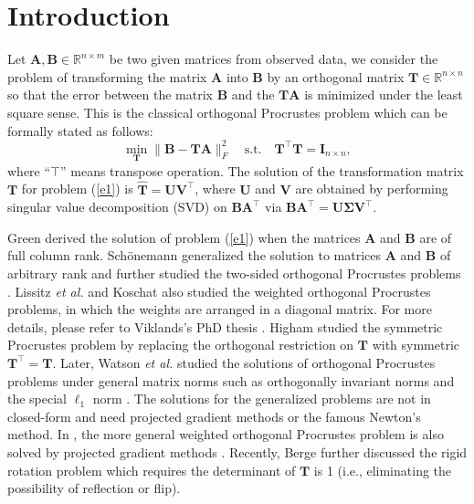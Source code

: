\documentclass[titlepage,11pt,twoside]{article}
\begin{document}
\section{Introduction}
Let $\mathbf{A},\mathbf{B}\in\mathbb{R}^{n\times m}$ be two given matrices from observed data, we consider the problem of transforming the matrix $\mathbf{A}$ into $\mathbf{B}$ by an orthogonal matrix $\mathbf{T}\in\mathbb{R}^{n\times n}$ so that the error between the matrix $\mathbf{B}$ and the $\mathbf{T}\mathbf{A}$ is minimized under the least square sense. This is the classical orthogonal Procrustes problem \cite{procrustesprogram} which can be formally stated as follows:
\begin{equation}\label{e1}
\min_{\mathbf{T}}\|\mathbf{B}-\mathbf{T}\mathbf{A}\|_{F}^{2}
\quad
\text{s.t.}
\quad
\mathbf{T}^{\top}\mathbf{T} = \mathbf{I}_{n\times n},
\end{equation}
where ``$\top$'' means transpose operation. The solution of the transformation matrix $\mathbf{T}$ for problem (\ref{e1}) is
$\mathbf{\hat{T}}=\mathbf{U}\mathbf{V}^{\top}$, where $\mathbf{U}$ and $\mathbf{V}$ are obtained by performing singular value decomposition (SVD) on $\mathbf{B}\mathbf{A}^{\top}$ via $\mathbf{B}\mathbf{A}^{\top}=\mathbf{U}\mathbf{\Sigma}\mathbf{V}^{\top}$.

Green \cite{green1952orthogonal} derived the solution of problem (\ref{e1}) when the matrices $\mathbf{A}$ and $\mathbf{B}$ are of full column rank. Sch{\"o}nemann \cite{schonemann1966generalized} generalized the solution to matrices $\mathbf{A}$ and $\mathbf{B}$ of arbitrary rank and further studied the two-sided orthogonal Procrustes problems \cite{schonemann1968two}. Lissitz \emph{et al.} \cite{Lissitz1976} and Koschat \cite{Koschat1991} also studied the weighted orthogonal Procrustes problems, in which the weights are arranged in a diagonal matrix. For more details, please refer to Viklands's PhD thesis \cite{viklands2006algorithms}. Higham \cite{higham1988symmetric} studied the symmetric Procrustes problem by replacing the orthogonal restriction on $\mathbf{T}$ with symmetric $\mathbf{T}^{\top}=\mathbf{T}$. Later, Watson \emph{et al.} studied the solutions of orthogonal Procrustes problems under general matrix norms such as orthogonally invariant norms \cite{Watson1994} and the special $\ell_{1}$ norm \cite{trendafilov2004l1}. The solutions for the generalized problems are not in closed-form and need projected gradient methods \cite{chu1990projected} or the famous Newton's method. In \cite{trendafilov2004l1}, the more general weighted orthogonal Procrustes problem is also solved by projected gradient methods \cite{chu1990projected}. Recently, Berge \cite{Berge2006} further discussed the rigid rotation problem which requires the determinant of $\mathbf{T}$ is 1 (i.e., eliminating the possibility of reflection or flip).
\end{document}
